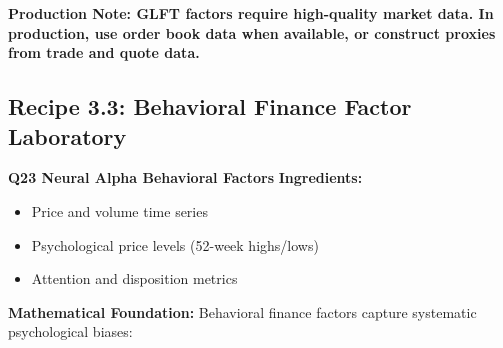 \documentclass[11pt,letterpaper,openany]{book}
\begin{document}
\textbf{Production Note: GLFT factors require high-quality market data. In production, use order book data when available, or construct proxies from trade and quote data.}

\subsection{Recipe 3.3: Behavioral Finance Factor Laboratory}

\textbf{Q23 Neural Alpha Behavioral Factors}
\textbf{Ingredients:}
\begin{itemize}
    \item Price and volume time series
    \item Psychological price levels (52-week highs/lows)
    \item Attention and disposition metrics
\end{itemize}
\textbf{Mathematical Foundation:}
Behavioral finance factors capture systematic psychological biases:
\end{document}
